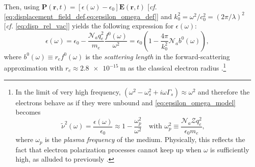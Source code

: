 Then, using $\mathbold{P}(\mathbold{r},t) = \left[ \epsilon (\omega) - \epsilon_0  \right] \mathbold{E}(\mathbold{r},t)$ [\emph{cf.\@} \cref{eq:displacement_field_def,eq:epsilon_omega_def}] and $k_0^2 = \omega^2 / c_0^2 = (2 \pi / \lambda)^2$ [\emph{cf.\@} \cref{eq:disp_rel_vac}] yields the following expression for $\epsilon (\omega)$: %
\begin{equation}\label{eq:epsilon_omega_model}
 \epsilon (\omega)  = \epsilon_0 - \frac{\mathcal{N}_a q_e^2}{m_e} \frac{f^0 (\omega)}{\omega^2} = \epsilon_0 \left( 1 - \frac{4 \pi}{k_0^2} \mathcal{N}_a b^0 (\omega) \right) ,
 \end{equation}
where $b^0 (\omega) \equiv r_e f^0 (\omega)$ is the \emph{scattering length} in the forward-scattering approximation with $r_e \approx \SI{2.8e-15}{\metre}$ as the classical electron radius \cite{Als-Nielsen11,deBergevin09}.\footnote{In the limit of very high frequency, $\left( \omega^2 - \omega_s^2 + i \omega \Gamma_s \right) \approx \omega^2$ and therefore the electrons behave as if they were unbound and \cref{eq:epsilon_omega_model} becomes 
\begin{equation*}\label{eq:epsilon_omega_approx}
 \tilde{\nu}^2 (\omega) = \frac{\epsilon (\omega)}{\epsilon_0} \approx 1 - \frac{\omega_p^2}{\omega^2} \quad \text{with } \omega_p^2 \equiv \frac{\mathcal{N}_a \mathcal{Z} q_e^2}{\epsilon_0 m_e} ,
 \end{equation*}
where $\omega_p$ is the \emph{plasma frequency} of the medium. 
Physically, this reflects the fact that electron polarization processes cannot keep up when $\omega$ is sufficiently high, as alluded to previously \cite{Landau60,Jackson75}.} 

